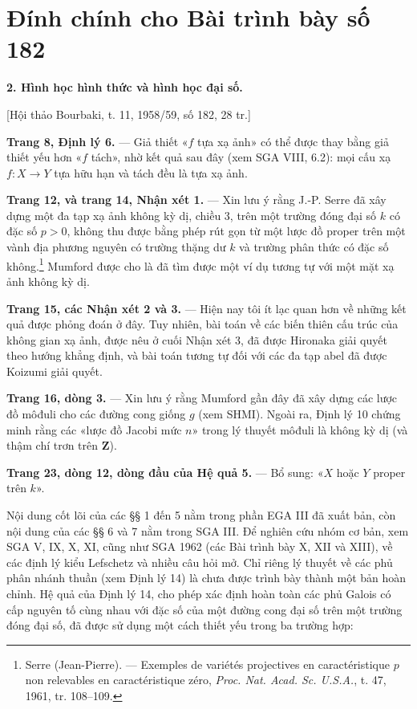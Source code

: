 \clearpage
\chapter*{Đính chính cho Bài trình bày số 182}
\setcounter{footnote}{1}

\noindent\textbf{2. Hình học hình thức và hình học đại số.}

\begin{center}
[Hội thảo Bourbaki, t. 11, 1958/59, số 182, 28 tr.]
\end{center}

\noindent\textbf{Trang 8, Định lý 6.} --- Giả thiết «$f$ tựa xạ ảnh» có thể
được thay bằng giả thiết yếu hơn «$f$ tách», nhờ kết quả sau đây (xem SGA VIII,
6.2): mọi cấu xạ $f:X\longrightarrow Y$ tựa hữu hạn và tách đều là tựa xạ ảnh.

\noindent\textbf{Trang 12, và trang 14, Nhận xét 1.} --- Xin lưu ý rằng J.-P.
Serre đã xây dựng một đa tạp xạ ảnh không kỳ dị, chiều 3, trên một trường đóng
đại số $k$ có đặc số $p>0$, không thu được bằng phép rút gọn từ một lược đồ
proper trên một vành địa phương nguyên có trường thặng dư $k$ và trường phân
thức có đặc số không.\footnote{Serre (Jean-Pierre). --- Exemples de variétés
projectives en caractéristique $p$ non relevables en caractéristique zéro,
\emph{Proc. Nat. Acad. Sc. U.S.A.}, t. 47, 1961, tr. 108--109.} Mumford được
cho là đã tìm được một ví dụ tương tự với một mặt xạ ảnh không kỳ dị.

\noindent\textbf{Trang 15, các Nhận xét 2 và 3.} --- Hiện nay tôi ít lạc quan
hơn về những kết quả được phỏng đoán ở đây. Tuy nhiên, bài toán về các biến
thiên cấu trúc của không gian xạ ảnh, được nêu ở cuối Nhận xét 3, đã được
Hironaka giải quyết theo hướng khẳng định, và bài toán tương tự đối với các đa
tạp abel đã được Koizumi giải quyết.

\noindent\textbf{Trang 16, dòng 3.} --- Xin lưu ý rằng Mumford gần đây đã xây
dựng các lược đồ môđuli cho các đường cong giống $g$ (xem SHMI). Ngoài ra,
Định lý 10 chứng minh rằng các «lược đồ Jacobi mức $n$» trong lý thuyết môđuli
là không kỳ dị (và thậm chí trơn trên $\mathbf Z$).

\noindent\textbf{Trang 23, dòng 12, dòng đầu của Hệ quả 5.} --- Bổ sung:
«$X$ hoặc $Y$ proper trên $k$».

Nội dung cốt lõi của các §§ 1 đến 5 nằm trong phần EGA III đã xuất bản, còn
nội dung của các §§ 6 và 7 nằm trong SGA III. Để nghiên cứu nhóm cơ bản, xem
SGA V, IX, X, XI, cũng như SGA 1962 (các Bài trình bày X, XII và XIII), về các
định lý kiểu Lefschetz và nhiều câu hỏi mở. Chỉ riêng lý thuyết về các phủ phân
nhánh thuần (xem Định lý 14) là chưa được trình bày thành một bản hoàn chỉnh.
Hệ quả của Định lý 14, cho phép xác định hoàn toàn các phủ Galois có cấp nguyên
tố cùng nhau với đặc số của một đường cong đại số trên một trường đóng đại số,
đã được sử dụng một cách thiết yếu trong ba trường hợp:

